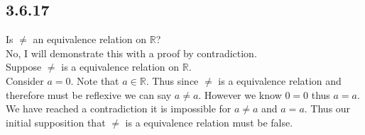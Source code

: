 \documentclass[12pt,a4paper]{article}
\begin{document}
\subsection{3.6.17}
Is $\neq$ an equivalence relation on $\mathbb{R}$?\\

No, I will demonstrate this with a proof by contradiction.\\

Suppose $\neq$ is a equivalence relation on $\mathbb{R}$.\\
Consider $a=0$.  Note that $a\in \mathbb{R}$.  Thus since $\neq$ is a equivalence relation and therefore must be reflexive we can say $a\neq a$.  However we know $0=0$ thus $a=a$.\\
We have reached a contradiction it is impossible for $a\neq a$ and $a=a$.  Thus our initial supposition that $\neq$ is a equivalence relation must be false.
\end{document}
